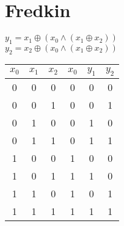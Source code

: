 \documentclass{iansnotes}
\begin{document}
\section{Fredkin}
$y_1 = x_1 \oplus (x_0 \land (x_1 \oplus x_2))$\\[2mm]
$y_2 = x_2 \oplus (x_0 \land (x_1 \oplus x_2))$
\begin{table}
  \begin{tabular}{ccc|ccc}
    $x_0$ & $x_1$ & $x_2$ & $x_0$ & $y_1$ & $y_2$ \\
    \midrule
    0 & 0 & 0 & 0 & 0 & 0 \\
    0 & 0 & 1 & 0 & 0 & 1 \\
    0 & 1 & 0 & 0 & 1 & 0 \\
    0 & 1 & 1 & 0 & 1 & 1 \\
    1 & 0 & 0 & 1 & 0 & 0 \\
    1 & 0 & 1 & 1 & 1 & 0 \\
    1 & 1 & 0 & 1 & 0 & 1 \\
    1 & 1 & 1 & 1 & 1 & 1 \\
  \end{tabular}
\end{table}\\[4mm]
\end{document}

